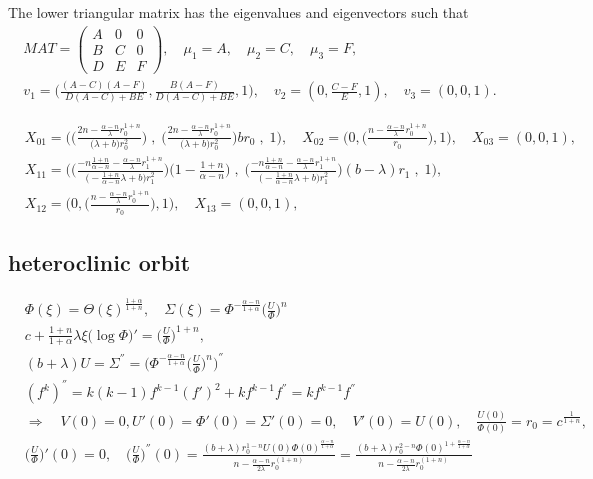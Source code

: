 \documentclass[a4paper,11pt]{article}
\begin{document}
The lower triangular matrix has the eigenvalues and eigenvectors such that
\begin{align*}
 MAT = \begin{pmatrix}
        A & 0 & 0\\
        B & C & 0\\
        D & E & F
       \end{pmatrix}, \quad
 \mu_1 = A, \quad\mu_2 = C, \quad\mu_3 = F,\\
 v_1 = \Big( \frac{ (A-C)(A-F) }{ D(A-C) + BE }, \frac{ B(A-F) }{ D(A-C) + BE }, 1), \quad  v_2 = (0, \frac{C-F}{E}, 1), \quad v_3 = (0,0,1).
\end{align*}

\begin{align*}
 &X_{01} = \bigg( \Big( \frac{2n - \frac{\alpha-n}{\lambda}r_0^{1+n}}{\big({\lambda}+b\big) r_0^2}\Big) \;,\;\Big( \frac{2n - \frac{\alpha-n}{\lambda}r_0^{1+n}}{\big({\lambda}+b\big) r_0^2}\Big)br_0\;,\;1\bigg),\quad
 X_{02} = \bigg(0, \Big(\frac{n- \frac{\alpha-n}{\lambda}r_0^{1+n}}{r_0}\Big), 1\bigg), \quad
 X_{03} = (0,0,1),\\
 &X_{11} = \bigg(  \Big(\frac{-n\frac{1+n}{\alpha-n} - \frac{\alpha-n}{\lambda}r_1^{1+n}}{\big(-\frac{1+n}{\alpha-n} \lambda +b\big) r_1^2}\Big)\Big(1-\frac{1+n}{\alpha-n}\Big) \;,\;\Big(\frac{-n\frac{1+n}{\alpha-n} - \frac{\alpha-n}{\lambda}r_1^{1+n}}{\big(-\frac{1+n}{\alpha-n} \lambda +b\big) r_1^2}\Big)(b-\lambda)r_1\;,\;1\bigg),\\
 &X_{12} = \bigg(0, \Big(\frac{n- \frac{\alpha-n}{\lambda}r_0^{1+n}}{r_0}\Big), 1\bigg), \quad
 X_{13} = (0,0,1),
\end{align*}

\subsection{heteroclinic orbit}
\begin{align*}
  &\Phi(\xi) = \Theta(\xi)^{\frac{1+\alpha}{1+n}}, \quad \Sigma(\xi) = \Phi^{-\frac{\alpha-n}{1+\alpha}} \Big(\frac{U}{\Phi}\Big)^n\\
  &c + \frac{1+n}{1+\alpha} \lambda \xi \big(\log\Phi\big)' = \Big(\frac{U}{\Phi}\Big)^{1+n},\\
  &(b+\lambda)U = \Sigma^{''} = \Big(\Phi^{-\frac{\alpha-n}{1+\alpha}}\Big(\frac{U}{\Phi}\Big)^{n}\Big)^{''}\\
  &(f^k)^{''} = k(k-1)f^{k-1}(f')^2 + kf^{k-1}f^{''} = kf^{k-1}f^{''}\\
  &\Longrightarrow  \quad V(0)=0, U'(0)=\Phi'(0)=\Sigma'(0)=0, \quad V'(0)=U(0),\quad \frac{U(0)}{\Phi(0)} = r_0 = c^{\frac{1}{1+n}},\\
  &\Big(\frac{U}{\Phi}\Big)'(0)=0, \quad \Big(\frac{U}{\Phi}\Big)^{''}(0) = \frac{ (b+\lambda) r_0^{1-n} U(0)\Phi(0)^{\frac{\alpha-n}{1+\alpha}} }{ n - \frac{\alpha-n}{2\lambda}r_0^{(1+n)}} = \frac{ (b+\lambda) r_0^{2-n} \Phi(0)^{1+\frac{\alpha-n}{1+\alpha}} }{ n - \frac{\alpha-n}{2\lambda}r_0^{(1+n)}}\\
\end{align*}
\end{document}
